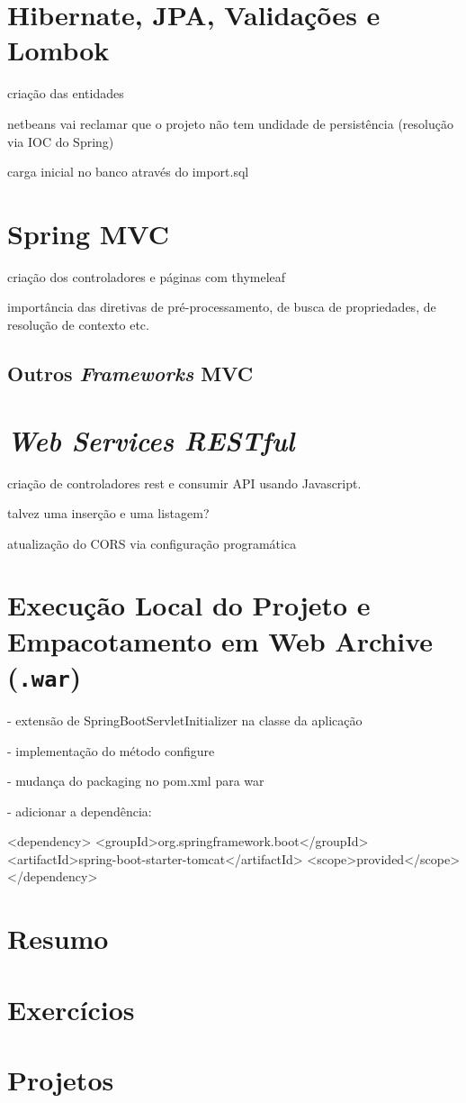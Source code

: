 \section{Hibernate, JPA, Validações e Lombok}

criação das entidades

netbeans vai reclamar que o projeto não tem undidade de persistência (resolução via IOC do Spring)

carga inicial no banco através do import.sql


\section{Spring MVC}

criação dos controladores e páginas com thymeleaf

importância das diretivas de pré-processamento, de busca de propriedades, de resolução de contexto etc.

\subsection{Outros \textit{Frameworks} MVC}



\section{\textit{Web Services RESTful}}

criação de controladores rest e consumir API usando Javascript.

talvez uma inserção e uma listagem?

atualização do CORS via configuração programática


\section{Execução Local do Projeto e Empacotamento em Web Archive (\texttt{.war})}

- extensão de SpringBootServletInitializer na classe da aplicação

- implementação do método configure

- mudança do packaging no pom.xml para war

- adicionar a dependência:

<dependency>
    <groupId>org.springframework.boot</groupId>
    <artifactId>spring-boot-starter-tomcat</artifactId>
    <scope>provided</scope>
</dependency>


\section{Resumo}

\section{Exercícios}

\section{Projetos}
